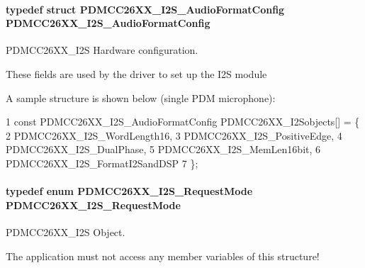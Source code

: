 \paragraph[{P\+D\+M\+C\+C26\+X\+X\+\_\+\+I2\+S\+\_\+\+Audio\+Format\+Config}]{\setlength{\rightskip}{0pt plus 5cm}typedef struct {\bf P\+D\+M\+C\+C26\+X\+X\+\_\+\+I2\+S\+\_\+\+Audio\+Format\+Config}  {\bf P\+D\+M\+C\+C26\+X\+X\+\_\+\+I2\+S\+\_\+\+Audio\+Format\+Config}}\label{_p_d_m_c_c26_x_x__util_8h_a3ba2d6efa7148c2657a7288f8fbc675c}


P\+D\+M\+C\+C26\+X\+X\+\_\+\+I2\+S Hardware configuration. 

These fields are used by the driver to set up the I2\+S module

A sample structure is shown below (single P\+D\+M microphone)\+: 
\begin{DoxyCode}
1 const PDMCC26XX\_I2S\_AudioFormatConfig PDMCC26XX\_I2Sobjects[] = \{
2         PDMCC26XX\_I2S\_WordLength16,
3         PDMCC26XX\_I2S\_PositiveEdge,
4         PDMCC26XX\_I2S\_DualPhase,
5         PDMCC26XX\_I2S\_MemLen16bit,
6         PDMCC26XX\_I2S\_FormatI2SandDSP
7 \};
\end{DoxyCode}
\paragraph[{P\+D\+M\+C\+C26\+X\+X\+\_\+\+I2\+S\+\_\+\+Request\+Mode}]{\setlength{\rightskip}{0pt plus 5cm}typedef enum {\bf P\+D\+M\+C\+C26\+X\+X\+\_\+\+I2\+S\+\_\+\+Request\+Mode}  {\bf P\+D\+M\+C\+C26\+X\+X\+\_\+\+I2\+S\+\_\+\+Request\+Mode}}\label{_p_d_m_c_c26_x_x__util_8h_a3efab417bd3d431079d133bbbe062c22}


P\+D\+M\+C\+C26\+X\+X\+\_\+\+I2\+S Object. 

The application must not access any member variables of this structure! 
